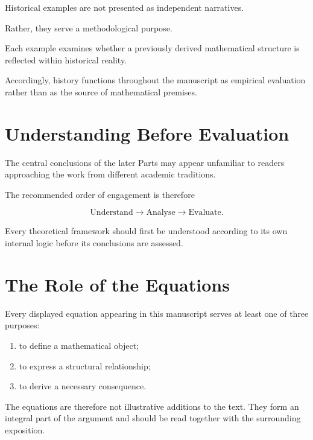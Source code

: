 \documentclass[11pt,openany]{book}
\theoremstyle{plain}
\theoremstyle{definition}
\begin{document}
Historical examples are not presented as independent narratives.

Rather, they serve a methodological purpose.

Each example examines whether a previously derived mathematical structure is reflected within historical reality.

Accordingly, history functions throughout the manuscript as empirical evaluation rather than as the source of mathematical premises.


\section*{Understanding Before Evaluation}

The central conclusions of the later Parts may appear unfamiliar to readers approaching the work from different academic traditions.

The recommended order of engagement is therefore

\[
\boxed{
\text{Understand}
\longrightarrow
\text{Analyse}
\longrightarrow
\text{Evaluate}.
}
\]

Every theoretical framework should first be understood according to its own internal logic before its conclusions are assessed.


\section*{The Role of the Equations}

Every displayed equation appearing in this manuscript serves at least one of three purposes:

\begin{enumerate}

\item to define a mathematical object;

\item to express a structural relationship;

\item to derive a necessary consequence.

\end{enumerate}

The equations are therefore not illustrative additions to the text. They form an integral part of the argument and should be read together with the surrounding exposition.
\end{document}
